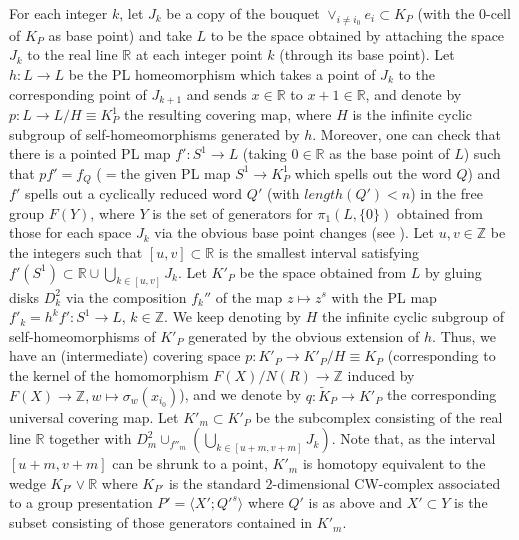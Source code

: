 \documentclass{amsart}[12pt]
\theoremstyle{definition}
\theoremstyle{remark}
\numberwithin{equation}{section}
\begin{document}
 For each
integer $k$, let $J_k$ be a copy of the bouquet $\vee_{i \neq i_0}
e_i {\subset} K_P$ (with the $0$-cell of $K_P$ as base point) and take
$L$ to be the space obtained by attaching the space $J_k$ to the
real line ${\mathbb R}$ at each integer point $k$ (through its base
point). Let $h : L {\longrightarrow} L$ be the PL homeomorphism which takes a
point of $J_k$ to the corresponding point of $J_{k+1}$ and sends
$x \in {\mathbb R}$ to $x+1 \in {\mathbb R}$, and denote by $p : L {\longrightarrow} L/H
\equiv K_P^1$ the resulting covering map, where $H$ is the
infinite cyclic subgroup of self-homeomorphisms generated by $h$.
Moreover, one can check that there is a pointed PL map $f' : S^1
{\longrightarrow} L$ (taking $0 \in {\mathbb R}$ as the base point of $L$) such that
$pf'=f_Q$ ($=$the given PL map $S^1 {\longrightarrow} K_P^1$ which spells out
the word $Q$) and $f'$ spells out a cyclically reduced word $Q'$
(with $length(Q')<n$) in the free group $F(Y)$, where $Y$ is the
set of generators for $\pi_1(L, \{0\})$ obtained from those for
each space $J_k$ via the obvious base point changes (see
\cite{DV}). Let $u,v \in {\mathbb Z}$ be the integers such that $[u,v]
{\subset} {\mathbb R}$ is the smallest interval satisfying $\displaystyle
f'(S^1) {\subset} {\mathbb R} \cup \bigcup_{k \in [u,v]} J_k$. Let $K'_P$ be
the space obtained from $L$ by gluing disks $D^2_k$ via the
composition $f_k''$ of the map $z \mapsto z^s$ with the PL map
$f'_k=h^kf' : S^1 {\longrightarrow} L$, $k \in {\mathbb Z}$. We keep denoting by $H$
the infinite cyclic subgroup of self-homeomorphisms of $K'_P$
generated by the obvious extension of $h$. Thus, we have an
(intermediate) covering space $p : K'_P {\longrightarrow} K'_P/H \equiv K_P$
(corresponding to the kernel of the homomorphism $F(X)/N(R) {\longrightarrow}
{\mathbb Z}$ induced by $F(X) {\longrightarrow} {\mathbb Z}, w \mapsto \sigma_w(x_{i_0})$),
and we denote by $q : \tilde{K}_P {\longrightarrow} K'_P$ the corresponding
universal covering map. Let $K'_m {\subset} K'_P$ be the subcomplex
consisting of the real line ${\mathbb R}$ together with $\displaystyle
D_m^2 \cup_{f''_m} \left( \bigcup_{k \in [u+m,v+m]} J_k \right)$.
Note that, as the interval $[u+m, v+m]$ can be shrunk to a point,
$K'_m$ is homotopy equivalent to the wedge $K_{P'} \vee {\mathbb R}$
where $K_{P'}$ is the standard $2$-dimensional CW-complex
associated to a group presentation $P' = \langle X';{Q'}^s
\rangle$ where $Q'$ is as above and $X' {\subset} Y$ is the
subset consisting of those generators contained in $K'_m$.\\
\end{document}
